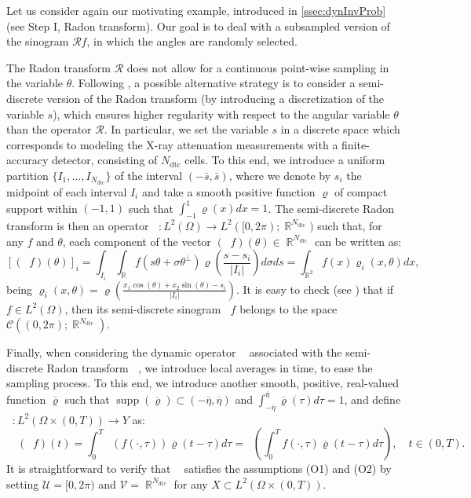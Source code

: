 \documentclass[11pt,a4paper]{article}
\numberwithin{equation}{section}
\newcounter{MotEx}
\DeclareMathOperator{\R}{\mathbb{R}}
\DeclareMathOperator{\supp}{supp}
\DeclareMathOperator{\radonSD}{\mathcal{R}^{\text{sd}}}
\DeclareMathOperator{\cradonSD}{\mathscr{R}^{\text{sd}}}
\newcommand{\Ndtc}{N_{\text{dtc}}}
\begin{document}
Let us consider again our motivating example, introduced in \cref{ssec:dynInvProb} (see Step I, Radon transform). Our goal is to deal with a subsampled version of the sinogram $\mathcal{R}f$, in which the angles are randomly selected.

\begin{MotExample} 
The Radon transform $\mathcal{R}$ does not allow for a continuous point-wise sampling in the variable $\theta$. Following \cite{bubba2021,Bubba22}, a possible alternative strategy is to consider a semi-discrete version of the Radon transform (by introducing a discretization of the variable $s$), which ensures higher regularity with respect to the angular variable $\theta$ than the operator $\mathcal{R}$. In particular, we set the variable $s$ in a discrete space which corresponds to modeling the X-ray attenuation measurements with a finite-accuracy detector, consisting of $\Ndtc$ cells. To this end, we introduce a uniform partition $\{I_1, \ldots, I_{\Ndtc}\}$ of the interval $(-\bar{s}, \bar{s})$, where we denote by $s_i$ the midpoint of each interval $I_i$ and take a smooth positive function $\varrho$ of compact support within $(-1,1)$ such that $\int_{-1}^1 \varrho(x) dx = 1$. The semi-discrete Radon transform is then an operator $\radonSD \colon L^2(\Omega) \rightarrow L^2([0,2\pi); \R^{\Ndtc})$ such that, for any $f$ and $\theta$, each component of the vector $(\radonSD f)(\theta) \in \R^{\Ndtc}$ can be written as:
\begin{equation}
	\label{eq:Radon_model_eqL}
	[(\radonSD f)(\theta)]_i = 
	\int_{I_i} \int_{\R} f(s \theta + \sigma \theta^\perp) \varrho\left(\frac{s-s_i}{|I_i|}\right) d\sigma ds= \int_{\R^2} f(x) \varrho_i(x,\theta) dx,
\end{equation}
being $\varrho_i(x,\theta) = \varrho\left(\frac{x_1\cos(\theta)+x_2 \sin(\theta)-s_i}{|I_i|}\right)$. It is easy to check (see \cite[Section 6.1]{bubba2021}) that if $f \in L^2(\Omega)$, then its semi-discrete sinogram $\radonSD f$ belongs to the space $\mathcal{C}((0,2\pi);\R^{\Ndtc})$. 


Finally, when considering the dynamic operator $\cradonSD$ associated with the semi-discrete Radon transform $\radonSD$, we introduce local averages in time, to ease the sampling process. To this end, we introduce another smooth, positive, real-valued function $\overline{\varrho}$ such that $\supp(\overline{\varrho})\subset(-\overline{\eta},\overline{\eta})$ and $\int_{-\overline{\eta}}^{\overline{\eta}} \overline{\varrho}(\tau)d\tau = 1$, and define $\cradonSD \colon L^2(\Omega \times (0,T)) \rightarrow Y$ as: 
\begin{equation}
    \label{eq:radonSD_time}
    \quad (\cradonSD f)(t) = \int_0^T \radonSD(f(\cdot,\tau))\overline{\varrho}(t-\tau) d\tau = \radonSD \left(\int_0^T f(\cdot,\tau)\overline{\varrho}(t-\tau) d\tau \right), \quad t \in (0,T).
\end{equation}
It is straightforward to verify that $\cradonSD$ satisfies the assumptions (O1) and (O2) by setting $\mathcal{U}=[0,2\pi)$ and $\mathcal{V} = \R^{N_\text{dtc}}$ for any $X \subset L^2(\Omega \times (0,T))$.



\end{MotExample}
\end{document}
